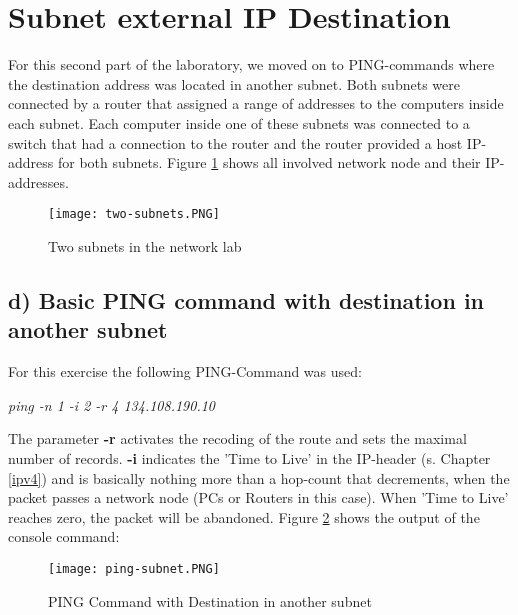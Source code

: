 \section{Subnet external IP Destination}
For this second part of the laboratory, we moved on to PING-commands where the destination address was located in another subnet. Both subnets were connected by a router that assigned a range of addresses to the computers inside each subnet. Each computer inside one of these subnets was connected to a switch that had a connection to the router and the router provided a host IP-address for both subnets. Figure \ref{two-subnets} shows all involved network node and their IP-addresses.
\begin{figure}[H]
	\centering
	\texttt{[image: two-subnets.PNG]}
	\caption{Two subnets in the network lab}
	\label{two-subnets}
\end{figure} 

\subsection{d) Basic PING command with destination in another subnet}
For this exercise the following PING-Command was used:
\begin{center}
	\textit{ping -n 1 -i 2 -r 4 134.108.190.10}
\end{center}
The parameter \textbf{-r} activates the recoding of the route and sets the maximal number of records. \textbf{-i} indicates the 'Time to Live' in the IP-header (s. Chapter \ref{ipv4}) and is basically nothing more than a hop-count that decrements, when the packet passes a network node (PCs or Routers in this case). When 'Time to Live' reaches zero, the packet will be abandoned. Figure \ref{ping-subnet} shows the output of the console command:
\begin{figure}[H]
	\centering
	\texttt{[image: ping-subnet.PNG]}
	\caption{PING Command with Destination in another subnet}
	\label{ping-subnet}
\end{figure} 

